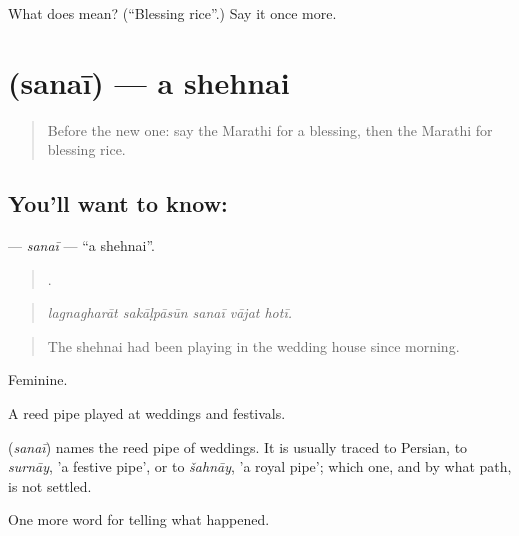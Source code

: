 \begin{tcolorbox}[breakable,colback=teal!4,colframe=teal!35!black,title={Before you move on}]
What does  mean? (\textquotedblleft{}Blessing rice\textquotedblright{}.) Say it once more.
\end{tcolorbox}
\section[\texorpdfstring{\mr{सनई} (sanaī)}{सनई (sanaī)}]{ (sanaī) — a shehnai}

\label{lesson:MR-C317-sanai}



\begin{quote}
Before the new one: say the Marathi for a blessing, then the Marathi for blessing rice.
\end{quote}

\subsection*{You'll want to know: }
\textbf{} — \emph{sanaī} — \textquotedblleft{}a shehnai\textquotedblright{}.

\begin{quote}
    .
\end{quote}

\begin{quote}
\emph{lagnagharāt sakāḷpāsūn sanaī vājat hotī.}
\end{quote}

\begin{quote}
The shehnai had been playing in the wedding house since morning.
\end{quote}

Feminine.

A reed pipe played at weddings and festivals.

\begin{cousinweb}
\textbf{} (\emph{sanaī}) names the reed pipe of weddings. It is usually traced to Persian, to \emph{surnāy}, 'a festive pipe', or to \emph{šahnāy}, 'a royal pipe'; which one, and by what path, is not settled.
\end{cousinweb}

\begin{grammarlens}[title={What you've built}]
One more word for telling what happened.
\end{grammarlens}

